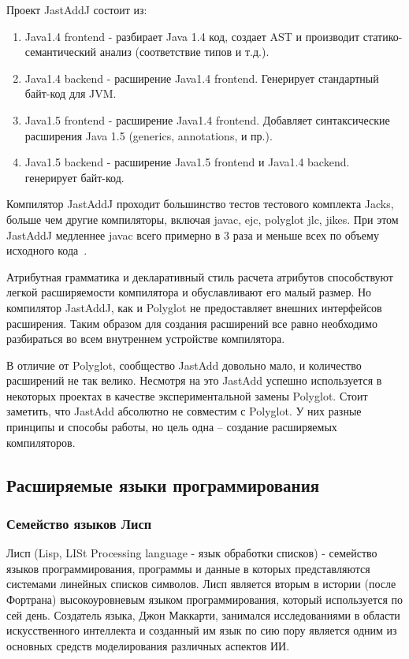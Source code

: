 \documentclass[a4paper,12pt]{article}
\begin{document}
Проект JastAddJ состоит из:
\begin{enumerate}
  \item Java1.4 frontend - разбирает Java 1.4 код, создает AST и производит
  статико-семантический анализ (соответствие типов и т.д.).
  \item Java1.4 backend - расширение Java1.4 frontend. Генерирует стандартный байт-код
  для JVM.
  \item Java1.5 frontend - расширение Java1.4 frontend. Добавляет синтаксические
  расширения Java 1.5 (generics, annotations, и пр.).
  \item Java1.5 backend - расширение Java1.5 frontend и Java1.4 backend. генерирует
  байт-код.
\end{enumerate}

Компилятор JastAddJ проходит большинство тестов тестового комплекта Jacks,
больше чем другие компиляторы, включая javac, ejc, polyglot jlc, jikes. При
этом JastAddJ медленнее javac всего примерно в 3 раза и меньше всех по объему
исходного кода~\cite{JastAddJ}.

Атрибутная грамматика и декларативный стиль расчета атрибутов способствуют
легкой расширяемости компилятора и обуславливают его малый размер. Но
компилятор JastAddJ, как и Polyglot не предоставляет внешних интерфейсов
расширения. Таким образом для создания расширений все равно необходимо
разбираться во всем внутреннем устройстве компилятора.

В отличие от Polyglot, сообщество JastAdd довольно мало, и количество
расширений не так велико. Несмотря на это JastAdd успешно используется в
некоторых проектах в качестве экспериментальной замены Polyglot. Стоит
заметить, что JastAdd абсолютно не совместим с Polyglot. У них разные принципы
и способы работы, но цель одна -- создание расширяемых компиляторов.

\subsection{Расширяемые языки программирования}

\subsubsection*{Семейство языков Лисп}
\label{lisp}
Лисп (Lisp, LISt Processing language - язык обработки списков) - семейство
языков программирования, программы и данные в которых представляются системами
линейных списков символов. Лисп является вторым в истории (после Фортрана)
высокоуровневым языком программирования, который используется по сей день.
Создатель языка, Джон Маккарти, занимался исследованиями в области
искусственного интеллекта и созданный им язык по сию пору является одним из
основных средств моделирования различных аспектов ИИ.   
\end{document}
